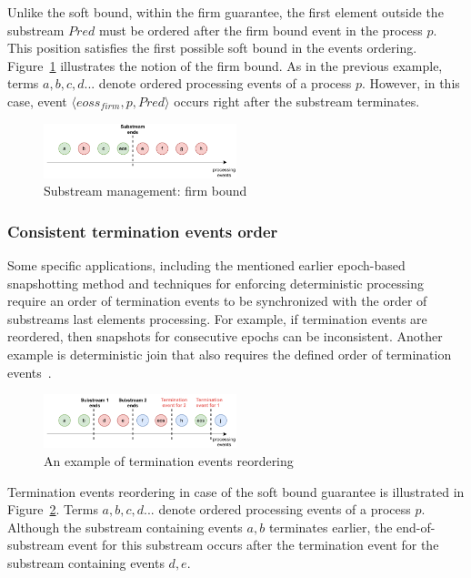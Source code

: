 Unlike the soft bound, within the firm guarantee, the first element outside the substream $Pred$ must be ordered after the firm bound event in the process $p$. This position satisfies the first possible soft bound in the events ordering. Figure~\ref{strict_guarantees} illustrates the notion of the firm bound. As in the previous example, terms $a,b,c,d...$ denote ordered processing events of a process $p$. However, in this case, event $\langle eoss_{firm}, p, Pred\rangle$ occurs right after the substream terminates.

\begin{figure}[htbp]
  \centering
  \includegraphics[width=0.50\textwidth]{pics/strict-guarantee.pdf}
  \caption{Substream management: firm bound}
  \label{strict_guarantees}
\end{figure}

\subsubsection{Consistent termination events order}
Some specific applications, including the mentioned earlier epoch-based snapshotting method and techniques for enforcing deterministic processing~\cite{we2018adbis} require an order of termination events to be synchronized with the order of substreams last elements processing. For example, if termination events are reordered, then snapshots for consecutive epochs can be inconsistent. Another example is deterministic join that also requires the defined order of termination events~\cite{gulisano2016scalejoin}.

\begin{figure}[htbp]
  \centering
  \includegraphics[width=0.50\textwidth]{pics/notifications-reordering.pdf}
  \caption{An example of termination events reordering}
  \label{notifications_reordering}
\end{figure}

Termination events reordering in case of the soft bound guarantee is illustrated in Figure~\ref{notifications_reordering}. Terms $a,b,c,d...$ denote ordered processing events of a process $p$. Although the substream containing events $a,b$ terminates earlier, the end-of-substream event for this substream occurs after the termination event for the substream containing events $d,e$. 

